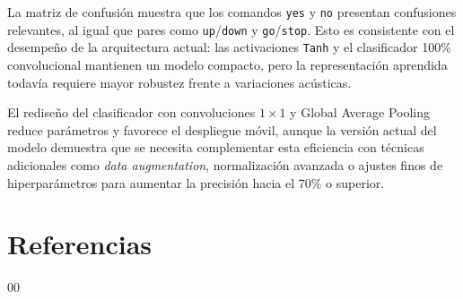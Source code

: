 \documentclass[conference]{IEEEtran}
\begin{document}
La matriz de confusión muestra que los comandos \texttt{yes} y \texttt{no} presentan confusiones relevantes, al igual que pares como \texttt{up}/\texttt{down} y \texttt{go}/\texttt{stop}. Esto es consistente con el desempeño de la arquitectura actual: las activaciones \texttt{Tanh} y el clasificador 100\% convolucional mantienen un modelo compacto, pero la representación aprendida todavía requiere mayor robustez frente a variaciones acústicas.

El rediseño del clasificador con convoluciones $1 \times 1$ y Global Average Pooling reduce parámetros y favorece el despliegue móvil, aunque la versión actual del modelo demuestra que se necesita complementar esta eficiencia con técnicas adicionales como \textit{data augmentation}, normalización avanzada o ajustes finos de hiperparámetros para aumentar la precisión hacia el 70\% o superior.

\section{Referencias}
\begin{thebibliography}{00}

\end{thebibliography}
\end{document}

